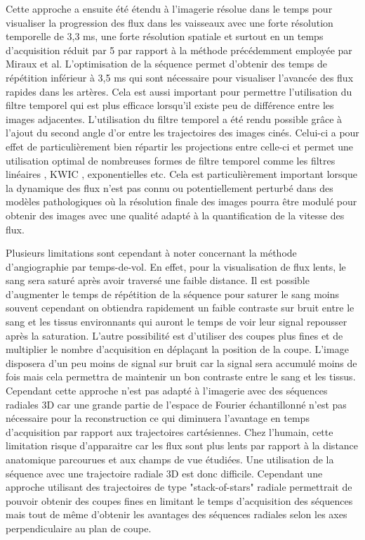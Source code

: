 Cette approche a ensuite été étendu à l'imagerie résolue dans le temps pour visualiser la progression des flux dans les vaisseaux avec une forte résolution temporelle de 3,3 ms, une forte résolution spatiale et surtout en un temps d'acquisition réduit par 5 par rapport à la méthode précédemment employée par Miraux et al.
L'optimisation de la séquence permet d'obtenir des temps de répétition inférieur à 3,5 ms qui sont nécessaire pour visualiser l'avancée des flux rapides dans les artères. Cela est aussi important pour permettre l'utilisation du filtre temporel qui est plus efficace lorsqu'il existe peu de différence entre les images adjacentes.
L'utilisation du filtre temporel a été rendu possible grâce à l'ajout du second angle d'or entre les trajectoires des images cinés. Celui-ci a pour effet de particulièrement bien répartir les projections entre celle-ci et permet une utilisation optimal de nombreuses formes de filtre temporel comme les filtres linéaires \cite{Barger:2002fk}, KWIC \cite{Song2004Dynamic-MRI-wit}, exponentielles etc. Cela est particulièrement important lorsque la dynamique des flux n'est pas connu ou potentiellement perturbé dans des modèles pathologiques où la résolution finale des images pourra être modulé pour obtenir des images avec une qualité adapté à la quantification de la vitesse des flux.

Plusieurs limitations sont cependant à noter concernant la méthode d'angiographie par temps-de-vol. En effet, pour la visualisation de flux lents, le sang sera saturé après avoir traversé une faible distance. Il est possible d'augmenter le temps de répétition de la séquence pour saturer le sang moins souvent cependant on obtiendra rapidement un faible contraste sur bruit entre le sang et les tissus environnants qui auront le temps de voir leur signal repousser après la saturation. L'autre possibilité est d'utiliser des coupes plus fines et de multiplier le nombre d'acquisition en déplaçant la position de la coupe. L'image disposera d'un peu moins de signal sur bruit car la signal sera accumulé moins de fois mais cela permettra de maintenir un bon contraste entre le sang et les tissus. Cependant cette  approche n'est pas adapté à l'imagerie avec des séquences radiales 3D car une grande partie de l'espace de Fourier échantillonné n'est pas nécessaire pour la reconstruction ce qui diminuera l'avantage en temps d'acquisition par rapport aux trajectoires cartésiennes.
Chez l'humain, cette limitation risque d'apparaitre car les flux sont plus lents par rapport à la distance anatomique parcourues et aux champs de vue étudiées. Une utilisation de la séquence avec une trajectoire radiale 3D est donc difficile. Cependant une approche utilisant des trajectoires de type "stack-of-stars" radiale permettrait de pouvoir obtenir des coupes fines en limitant le temps d'acquisition des séquences mais tout de même d'obtenir les avantages des séquences radiales selon les axes perpendiculaire au plan de coupe. 

